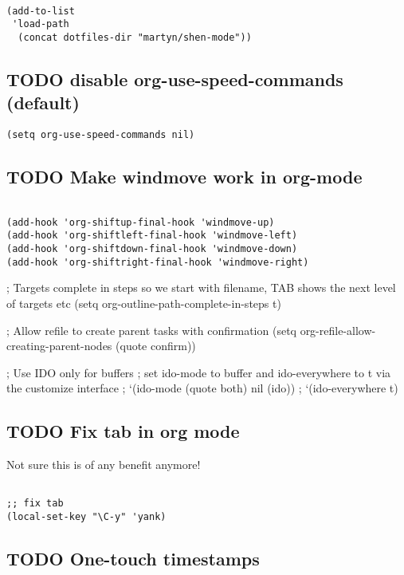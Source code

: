 \documentclass[colorlinks=true,urlcolor=blue,listings-sv]{article}
\begin{document}
\lstset{language=Lisp}
\begin{lstlisting}

(add-to-list 
 'load-path
  (concat dotfiles-dir "martyn/shen-mode"))
\end{lstlisting}
\subsection{\textbf{TODO} disable org-use-speed-commands (default)}
\label{sec-2-13}



\lstset{language=Lisp}
\begin{lstlisting}
(setq org-use-speed-commands nil)
\end{lstlisting}
\subsection{\textbf{TODO} Make windmove work in org-mode}
\label{sec-2-14}



\lstset{language=Lisp}
\begin{lstlisting}

(add-hook 'org-shiftup-final-hook 'windmove-up)
(add-hook 'org-shiftleft-final-hook 'windmove-left)
(add-hook 'org-shiftdown-final-hook 'windmove-down)
(add-hook 'org-shiftright-final-hook 'windmove-right)
\end{lstlisting}

; Targets complete in steps so we start with filename, TAB shows the next level of targets etc
(setq org-outline-path-complete-in-steps t)

; Allow refile to create parent tasks with confirmation
(setq org-refile-allow-creating-parent-nodes (quote confirm))

; Use IDO only for buffers
; set ido-mode to buffer and ido-everywhere to t via the customize interface
; `(ido-mode (quote both) nil (ido))
; `(ido-everywhere t)
\subsection{\textbf{TODO} Fix tab in org mode}
\label{sec-2-15}


Not sure this is of any benefit anymore!    


\lstset{language=Lisp}
\begin{lstlisting}

;; fix tab
(local-set-key "\C-y" 'yank)
\end{lstlisting}
\subsection{\textbf{TODO} One-touch timestamps}
\label{sec-2-16}
\end{document}

